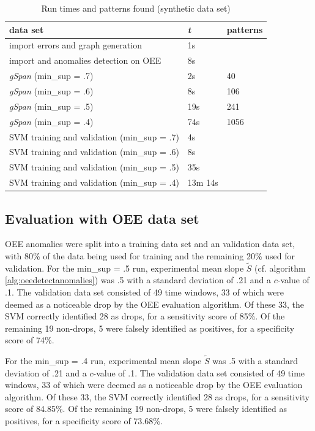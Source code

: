 \documentclass[pdftex,12pt,a4paper]{report}
\begin{document}
\begin{table}[]
	\centering
	\caption{Run times and patterns found (synthetic data set)}
	\label{table:runtimes_syn}
	\begin{tabular}{l|l|l}
		data set                                      & \textit{t} & patterns \\ \hline
		import errors and graph generation            & 1s         &          \\
		import and anomalies detection on OEE         & 8s         &          \\ \hline
		\textit{gSpan} (min\_sup = .7)                & 2s         & 40       \\
		\textit{gSpan} (min\_sup = .6)                & 8s         & 106      \\
		\textit{gSpan} (min\_sup = .5)                & 19s        & 241      \\
		\textit{gSpan} (min\_sup = .4)                & 74s        & 1056     \\ \hline
		SVM training and validation   (min\_sup = .7) & 4s         &          \\
		SVM training and validation   (min\_sup = .6) & 8s         &          \\
		SVM training and validation   (min\_sup = .5) & 35s        &          \\
		SVM training and validation   (min\_sup = .4) & 13m 14s    &
	\end{tabular}
\end{table}

\subsection{Evaluation with OEE data set}
OEE anomalies were split into a training data set and an validation data set, with 80\% of the data being used for training and the remaining 20\% used for validation. For the min\_sup = .5 run, experimental mean slope $\tilde{S}$ (cf. algorithm \ref{alg:oeedetectanomalies}) was .5 with a standard deviation of .21 and a $c$-value of .1. The validation data set consisted of 49 time windows, 33 of which were deemed as a noticeable drop by the OEE evaluation algorithm. Of these 33, the SVM correctly identified 28 as drops, for a sensitivity score of 85\%. Of the remaining 19 non-drops, 5 were falsely identified as positives, for a specificity score of 74\%.

For the min\_sup = .4 run, experimental mean slope $\tilde{S}$ was .5 with a standard deviation of .21 and a $c$-value of .1. The validation data set consisted of 49 time windows, 33 of which were deemed as a noticeable drop by the OEE evaluation algorithm. Of these 33, the SVM correctly identified 28 as drops, for a sensitivity score of 84.85\%. Of the remaining 19 non-drops, 5 were falsely identified as positives, for a specificity score of 73.68\%.
\end{document}
